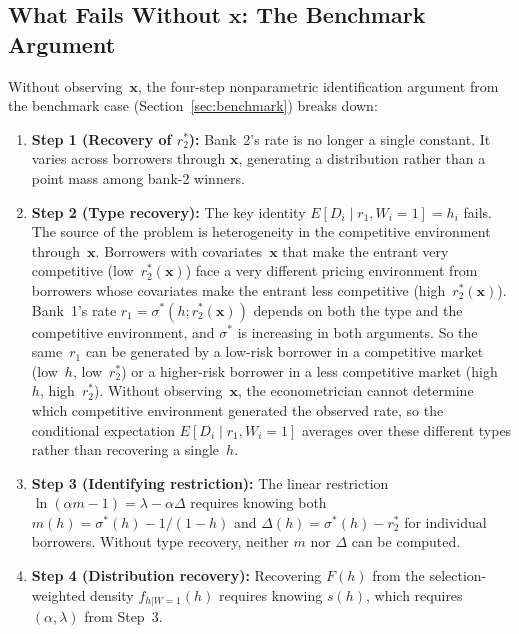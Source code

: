 \documentclass[12pt]{article}
\theoremstyle{plain}
\theoremstyle{plain}
\theoremstyle{definition}  %
\theoremstyle{remark}  %
\begin{document}
\subsection{What Fails Without $\mathbf{x}$: The Benchmark Argument}\label{sec:what_fails}

Without observing~$\mathbf{x}$, the four-step nonparametric identification argument from the benchmark case (Section~\ref{sec:benchmark}) breaks down:
\begin{enumerate}
    \item[(i)] \textbf{Step 1 (Recovery of $r_2^*$):} Bank~2's rate is no longer a single constant. It varies across borrowers through $\mathbf{x}$, generating a distribution rather than a point mass among bank-2 winners.
    
    \item[(ii)] \textbf{Step 2 (Type recovery):} The key identity $E[D_i \mid r_1, W_i=1] = h_i$ fails.  The source of the problem is heterogeneity in the competitive environment through~$\mathbf{x}$.  Borrowers with covariates~$\mathbf{x}$ that make the entrant very competitive (low~$r_2^*(\mathbf{x})$) face a very different pricing environment from borrowers whose covariates make the entrant less competitive (high~$r_2^*(\mathbf{x})$).  Bank~1's rate $r_1 = \sigma^*(h; r_2^*(\mathbf{x}))$ depends on both the type and the competitive environment, and $\sigma^*$ is increasing in both arguments.  So the same~$r_1$ can be generated by a low-risk borrower in a competitive market (low~$h$, low~$r_2^*$) or a higher-risk borrower in a less competitive market (high~$h$, high~$r_2^*$).  Without observing~$\mathbf{x}$, the econometrician cannot determine which competitive environment generated the observed rate, so the conditional expectation $E[D_i \mid r_1, W_i\!=\!1]$ averages over these different types rather than recovering a single~$h$.
    
    \item[(iii)] \textbf{Step 3 (Identifying restriction):} The linear restriction $\ln(\alpha m - 1) = \lambda - \alpha\Delta$ requires knowing both $m(h) = \sigma^*(h) - 1/(1-h)$ and $\Delta(h) = \sigma^*(h) - r_2^*$ for individual borrowers. Without type recovery, neither $m$ nor $\Delta$ can be computed.
    
    \item[(iv)] \textbf{Step 4 (Distribution recovery):} Recovering $F(h)$ from the selection-weighted density $f_{h|W=1}(h)$ requires knowing $s(h)$, which requires $(\alpha, \lambda)$ from Step~3.
\end{enumerate}
\end{document}
